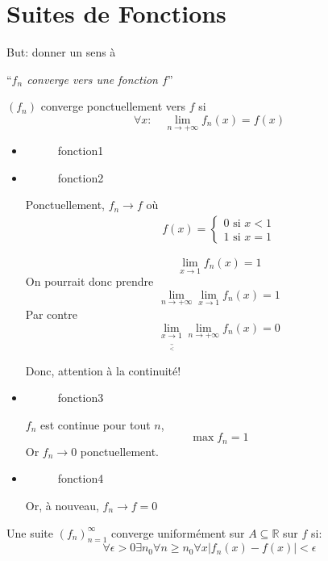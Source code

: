 \documentclass[../main.tex]{subfiles}
\begin{document}
\section{Suites de Fonctions}
But: donner un sens à 
\begin{center}
``\textit{$f_n$ converge vers une fonction $f$}''
\end{center}
\begin{defn}
	$( f_n)$ converge ponctuellement vers $f$ si
	\[ 
		\forall x : \quad \lim_{n \to  + \infty} f_n( x) = f( x) 
	\]
\end{defn}
\begin{exemple}
\begin{itemize}
\item 
\begin{figure}[H]
    \centering
    \caption{fonction1}
    \label{fig:fonction1}
\end{figure}
\item 
\begin{figure}[H]
    \centering
    \caption{fonction2}
    \label{fig:fonction2}
\end{figure}
Ponctuellement, $f_n \to f$ où
\begin{align*}
	f( x) =
	\begin{cases}
	0 \text{ si } x<1\\
	1 \text{ si } x=1
	\end{cases}
\end{align*}
\begin{rmq}
\[ 
	\lim_{x \to 1} f_n( x) = 1
\]
On pourrait donc prendre
\[ 
	\lim_{n \to  + \infty} \lim_{x \to 1} f_n( x) = 1
\]
Par contre
\[ 
	\lim_{x \underbrace{\to}_{<} 1} \lim_{n \to  + \infty} f_n( x)  = 0
\]

\end{rmq}
Donc, attention à la continuité!
\item 
\begin{figure}[H]
    \centering
    \caption{fonction3}
    \label{fig:fonction3}
\end{figure}
$f_n$ est continue pour tout $n$, 
\[ 
\max f_n = 1
\]
Or $f_n \to 0$ ponctuellement.
\item 
\begin{figure}[H]
    \centering
    \caption{fonction4}
    \label{fig:fonction4}
\end{figure}
Or, à nouveau, $f_n \to f=0$

\end{itemize}
\end{exemple}
\begin{defn}
	Une suite $( f_n) _{n=1} ^{ \infty }$ converge uniformément sur $A \subseteq \mathbb{R}$ sur $f$ si:
	\[ 
		\forall \epsilon > 0 \exists n_0 \forall n \geq n_0 \forall x |f_n( x) - f( x) | < \epsilon
	\]
	

\end{defn}
\end{document}
